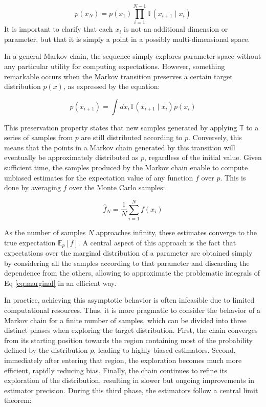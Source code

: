 \begin{equation}
    p(x_N) = p(x_1) \prod_{i=1}^{N-1} \mathbb{T}(x_{i+1} \mid x_{i})
\end{equation}
It is important to clarify that each $x_i$ is not an additional dimension or parameter, but that it is simply a point
in a possibly multi-dimensional space.

In a general Markov chain, the sequence simply explores parameter space without any particular utility for computing expectations. However, something remarkable occurs when the Markov transition preserves a certain target distribution $p(x)$, as expressed by the equation:

\begin{equation}
    p(x_{i+1}) = \int dx_{i} \mathbb{T}(x_{i+1} \mid x_{i})p(x_{i}) 
\end{equation}

This preservation property states that new samples generated by applying $\mathbb{T}$ to a series of samples from $p$
are still distributed according to $p$. Conversely, this means that the points in a Markov chain generated by this
transition will eventually be approximately distributed as $p$, regardless of the initial value. Given sufficient time,
the samples produced by the Markov chain enable to compute unbiased estimates for the expectation value of any function
$f$ over $p$. This is done by averaging $f$ over the Monte Carlo samples:

\begin{equation}
    \hat{f}_N = \frac{1}{N} \sum_{i=1}^N f(x_i)
\end{equation}

As the number of samples $N$ approaches infinity, these estimates converge to the true expectation $\mathbb{E}_p[f]$. 
A central aspect of this approach is the fact that expectations over the marginal distribution of a parameter are obtained simply by considering all the samples according to that parameter and discarding the dependence from the others, allowing to approximate the problematic integrals of Eq \ref{eq:marginal} in an efficient way.

In practice, achieving this asymptotic behavior is often infeasible due to limited computational resources. Thus, it is more pragmatic to consider the behavior of a Markov chain for a finite number of samples, which can be divided into three distinct phases when exploring the target distribution.
First, the chain converges from its starting position towards the region containing most of the probability defined by
the distribution $p$, leading to highly biased estimators. Second, immediately after entering that region, the exploration becomes much more efficient, rapidly reducing bias. Finally, the chain continues to refine its exploration of the distribution, resulting in slower but ongoing improvements in estimator precision. During this third phase, the estimators follow a central limit theorem:

